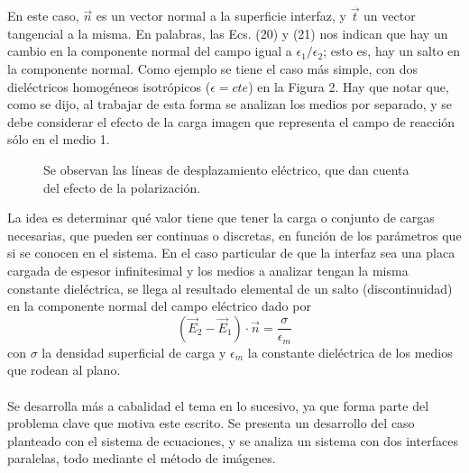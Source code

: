 \documentclass[12pt, notitlepage]{article}
\begin{document}
En este caso, $\vec{n}$ es un vector normal a la superficie interfaz, y $\vec{t}$ un vector tangencial a la misma. En palabras, las Ecs. (20) y (21) nos indican que hay un cambio en la componente normal del campo igual a $\epsilon_1/\epsilon_2$; esto es, hay un salto en la componente normal. Como ejemplo se tiene el caso más simple, con dos dieléctricos homogéneos isotrópicos ($\epsilon = cte$) en la Figura 2. Hay que notar que, como se dijo, al trabajar de esta forma se analizan los medios por separado, y se debe considerar el efecto de la carga imagen que representa el campo de reacción sólo en el medio 1.
\begin{figure}[H]
\vspace{2cm}
\centering

\caption{Se observan las líneas de desplazamiento eléctrico, que dan cuenta del efecto de la polarización.}
\end{figure}
\noindent
La idea es determinar qué valor tiene que tener la carga o conjunto de cargas necesarias, que pueden ser continuas o discretas, en función de los parámetros que si se conocen en el sistema. En el caso particular de que la interfaz sea una placa cargada de espesor infinitesimal y los medios a analizar tengan la misma constante dieléctrica, se llega al resultado elemental de un salto (discontinuidad) en la componente normal del campo eléctrico dado por
\begin{equation}
(\vec{E}_2 - \vec{E}_1)\cdot\vec{n} = \frac{\sigma}{\epsilon_m}
\end{equation}
con $\sigma$ la densidad superficial de carga y $\epsilon_m$ la constante dieléctrica de los medios que rodean al plano. \\\\
Se desarrolla más a cabalidad el tema en lo sucesivo, ya que forma parte del problema clave que motiva este escrito. Se presenta un desarrollo del caso planteado con el sistema de ecuaciones, y se analiza un sistema con dos interfaces paralelas, todo mediante el método de imágenes. 


\end{document}
